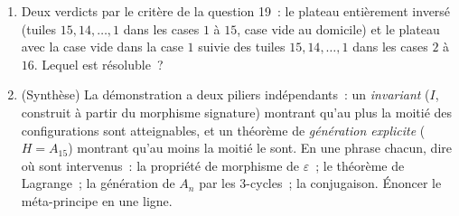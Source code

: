 \begin{problem}
\begin{enumerate}[resume]
         de $n \geq 4$ cases portant $n - 1$ tuiles. Montrer que
        l'  des tuiles est invariant, que chaque classe
        d'atteignabilité a exactement $n(n - 1)$ configurations
        \emph{(les classes sont les orbites d'un 
        d' $\operatorname{lcm}(n, n-1) = n(n-1)$)}, et qu'il y a
        $(n - 2)!$ classes --- pour $n \geq 5$ bien plus que $2$~:
        sur un plateau étroit l'invariant de parité ne capture
        presque rien, et la géométrie décide.
  \item Deux verdicts par le critère de la question 19~: le plateau
        entièrement inversé (tuiles $15, 14, \dots, 1$ dans les cases
        $1$ à $15$, case vide au domicile) et le plateau avec la case
        vide dans la case $1$ suivie des tuiles $15, 14, \dots, 1$
        dans les cases $2$ à $16$. Lequel est résoluble~?
  \item (Synthèse) La démonstration a deux piliers indépendants~: un
        \emph{invariant} ($I$, construit à partir du morphisme
        signature) montrant qu'au plus la moitié des configurations
        sont atteignables, et un théorème de \emph{génération
        explicite} ($H = A_{15}$) montrant qu'au moins la moitié le
        sont. En une phrase chacun, dire où sont intervenus~: la
        propriété de morphisme de $\varepsilon$~; le théorème de
        Lagrange~; la génération de $A_n$ par les $3$-cycles~; la
        conjugaison. Énoncer le méta-principe en une ligne.
\end{enumerate}
\end{problem}
